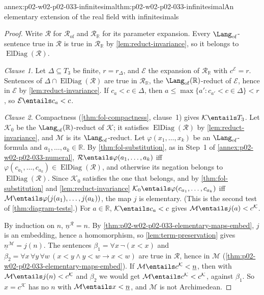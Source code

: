 \begin{annexitem}{annex:p02-w02-p02-033-infinitesimal}{thm:p02-w02-p02-033-infinitesimal}{An elementary extension of the real field with infinitesimals}
\begin{proof}
Write \(\mathcal R\) for \(\mathcal R_{\mathrm{of}}\) and
\(\mathcal R_{\mathbb R}\) for its parameter expansion.  Every
\(\Lang_{\mathrm{of}}\)-sentence true in \(\mathcal R\) is true in
\(\mathcal R_{\mathbb R}\) by \cref{lem:reduct-invariance}, so it belongs to
\(\operatorname{ElDiag}(\mathcal R)\).

\emph{Clause 1.}  Let \(\Delta\subseteq T_3\) be finite, \(r=r_\Delta\), and
\(\mathcal E\) the expansion of \(\mathcal R_{\mathbb R}\) with
\(c^{\mathcal E}=r\).  Sentences of
\(\Delta\cap\operatorname{ElDiag}(\mathcal R)\) are true in
\(\mathcal R_{\mathbb R}\), the
\(\Lang_{\mathrm{of}}(\mathbb R)\)-reduct of \(\mathcal E\), hence in
\(\mathcal E\) by \cref{lem:reduct-invariance}.  If
\(c_a<c\in\Delta\), then \(a\leq\max\{a':c_{a'}<c\in\Delta\}<r\), so
\(\mathcal E\entails c_a<c\).

\emph{Clause 2.}  Compactness (\cref{thm:fol-compactness}, clause~1) gives
\(\mathcal K\entails T_3\).  Let \(\mathcal K_0\) be the
\(\Lang_{\mathrm{of}}(\mathbb R)\)-reduct of \(\mathcal K\); it satisfies
\(\operatorname{ElDiag}(\mathcal R)\) by \cref{lem:reduct-invariance}, and
\(\mathcal M\) is its \(\Lang_{\mathrm{of}}\)-reduct.  Let
\(\varphi(x_1,\ldots,x_k)\) be an \(\Lang_{\mathrm{of}}\)-formula and
\(a_1,\ldots,a_k\in\mathbb R\).  By \cref{thm:fol-substitution}, as in
Step~1 of \cref{annex:p02-w02-p02-033-numeral},
\(\mathcal R\entails\varphi(a_1,\ldots,a_k)\) iff
\(\varphi(c_{a_1},\ldots,c_{a_k})\in\operatorname{ElDiag}(\mathcal R)\), and
otherwise its negation belongs to \(\operatorname{ElDiag}(\mathcal R)\).
Since \(\mathcal K_0\) satisfies the one that belongs, and by
\cref{thm:fol-substitution} and \cref{lem:reduct-invariance}
\(\mathcal K_0\entails\varphi(c_{a_1},\ldots,c_{a_k})\) iff
\(\mathcal M\entails\varphi(j(a_1),\ldots,j(a_k))\), the map \(j\) is
elementary.  (This is the second test of \cref{thm:diagram-tests}.)  For
\(a\in\mathbb R\), \(\mathcal K\entails c_a<c\) gives
\(\mathcal M\entails j(a)<c^{\mathcal K}\).

By induction on \(n\), \(\underline n^{\mathcal R}=n\).  By
\cref{thm:p02-w02-p02-033-elementary-maps-embed}, \(j\) is an embedding,
hence a homomorphism, so \cref{lem:term-preservation} gives
\(\underline n^{\mathcal M}=j(n)\).  The sentences
\(\beta_1=\forall x\,\neg(x<x)\) and
\(\beta_2=\forall x\,\forall y\,\forall w\,(x<y\land y<w\to x<w)\) are true in
\(\mathcal R\), hence in \(\mathcal M\)
(\cref{thm:p02-w02-p02-033-elementary-maps-embed}).  If
\(\mathcal M\entails c^{\mathcal K}<\underline n\), then with
\(\mathcal M\entails j(n)<c^{\mathcal K}\) and \(\beta_2\) we would get
\(\mathcal M\entails c^{\mathcal K}<c^{\mathcal K}\), against \(\beta_1\).
So \(x=c^{\mathcal K}\) has no \(n\) with
\(\mathcal M\entails x<\underline n\), and \(\mathcal M\) is not
Archimedean.


\end{proof}
\end{annexitem}
